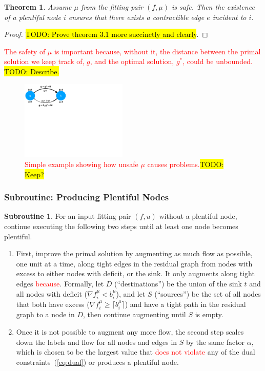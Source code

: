 \documentclass[11pt]{article}
\newtheorem{theorem}{Theorem}[section]
\theoremstyle{definition}
\theoremstyle{definition}
\newtheorem{subroutine}{Subroutine}
\newcommand{\rewrite}[1]{\textcolor{red}{#1}}
\newcommand{\todo}[1]{\hl{TODO: #1}}
\begin{document}
\begin{theorem} Assume $\mu$ from the fitting pair $(f,\mu)$ is safe.
Then the existence of a plentiful node $i$ ensures
that there exists a contractible edge $e$ incident to $i$.
\end{theorem}
\begin{proof}
\todo{Prove theorem 3.1 more succinctly and clearly}.
\end{proof}

\rewrite{The safety of $\mu$ is important because, without it, the distance between
the primal solution we keep track of, $g$, and the optimal solution, $g^*$, could
be unbounded.} \todo{Describe.}

\begin{figure}[h]
\centering
\includegraphics[width=0.45\textwidth]{figs/unsafe.pdf}
\caption{
\label{fig:unsafe}
\rewrite{Simple example showing how unsafe $\mu$ causes problems.}\todo{Keep?}
}
\end{figure}

\subsubsection{Subroutine: Producing Plentiful Nodes}
\label{sec:sub-ppn}

\begin{subroutine}
For an input fitting pair $(f,u)$ without a plentiful node,
continue executing the following two steps until at least one node becomes
plentiful.
\begin{enumerate}
\item First, improve the primal solution by augmenting as much flow as possible,
one unit at a time, along tight edges in the residual graph 
from nodes with excess to either nodes with deficit, or the sink.
It only augments along tight edges \rewrite{because}. Formally, let
$D$ (``destinations'') be the union of the sink $t$ and all nodes with 
deficit ($\nabla f_i^{\mu} < b_i^{\mu}$), and let $S$ (``sources'') be
the set of all nodes that both have excess ($\nabla f_i^{\mu} \ge \lceil b_i^{\mu} \rceil$)
and have a tight path in the residual graph to a node in $D$, then
continue augmenting until $S$ is empty.
\item Once it is not possible to augment any more flow, the second step scales down
the labels and flow for all nodes and edges in $S$ by the same factor $\alpha$,
which is chosen to be the largest value that \rewrite{does not violate} any of the dual
constraints~(\ref{eq:dual}) or produces a plentiful node.
\end{enumerate}
\end{subroutine}
\end{document}
